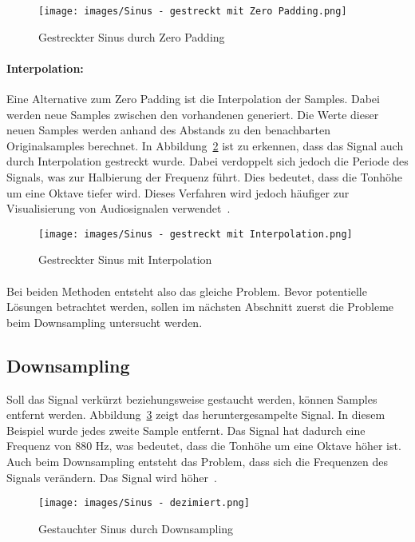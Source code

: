 \begin{figure}[h]
    \centering
    \texttt{[image: images/Sinus - gestreckt mit Zero Padding.png]}
    \caption{Gestreckter Sinus durch Zero Padding}
    \label{fig:Zero Padding}
\end{figure}

\paragraph{Interpolation:}
Eine Alternative zum Zero Padding ist die Interpolation der Samples. Dabei werden neue Samples zwischen den vorhandenen generiert. Die Werte dieser neuen Samples werden anhand des Abstands zu den benachbarten Originalsamples berechnet. In Abbildung~\ref{fig:Interpolation} ist zu erkennen, dass das Signal auch durch Interpolation gestreckt wurde. Dabei verdoppelt sich jedoch die Periode des Signals, was zur Halbierung der Frequenz führt. Dies bedeutet, dass die Tonhöhe um eine Oktave tiefer wird. Dieses Verfahren wird jedoch häufiger zur Visualisierung von Audiosignalen verwendet~\cite{werner2018digitale}.

\begin{figure}[h]
    \centering
    \texttt{[image: images/Sinus - gestreckt mit Interpolation.png]}
    \caption{Gestreckter Sinus mit Interpolation}
    \label{fig:Interpolation}
\end{figure}

\paragraph{}
Bei beiden Methoden entsteht also das gleiche Problem. Bevor potentielle Lösungen betrachtet werden, sollen im nächsten Abschnitt zuerst die Probleme beim Downsampling untersucht werden.

\subsection{Downsampling}
Soll das Signal verkürzt beziehungsweise gestaucht werden, können Samples entfernt werden. Abbildung~\ref{fig:dec} zeigt das heruntergesampelte Signal. In diesem Beispiel wurde jedes zweite Sample entfernt. Das Signal hat dadurch eine Frequenz von 880 Hz, was bedeutet, dass die Tonhöhe um eine Oktave höher ist. Auch beim Downsampling entsteht das Problem, dass sich die Frequenzen des Signals verändern. Das Signal wird höher~\cite{Bosi2004IntroductionTD}.

\begin{figure}[h]
    \centering
    \texttt{[image: images/Sinus - dezimiert.png]}
    \caption{Gestauchter Sinus durch Downsampling}
    \label{fig:dec}
\end{figure}
 
